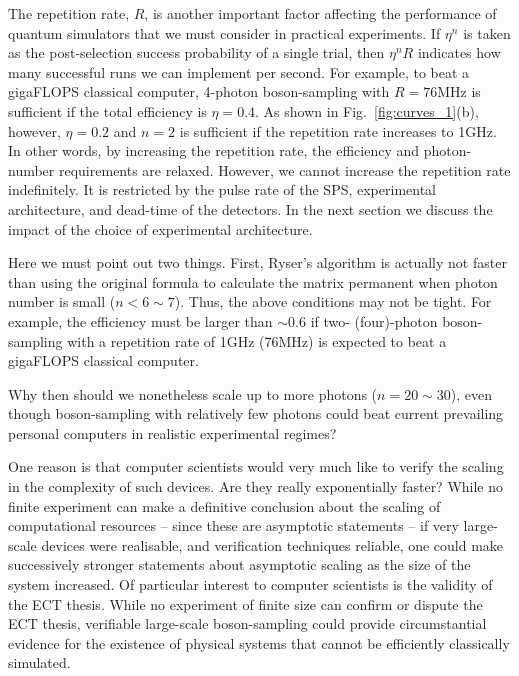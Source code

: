 \documentclass[aps,rmp,twocolumn,amsmath,amssymb,nofootinbib,superscriptaddress]{revtex4}
\begin{document}
The repetition rate, $R$, is another important factor affecting the performance of quantum simulators that we must consider in practical experiments. If $\eta^n$ is taken as the post-selection success probability of a single trial, then \mbox{$\eta^n R$} indicates how many successful runs we can implement per second. For example, to beat a gigaFLOPS classical computer, 4-photon boson-sampling with \mbox{$R=76\mathrm{MHz}$} is sufficient if the total efficiency is \mbox{$\eta=0.4$}. As shown in Fig.~\ref{fig:curves_1}(b), however, \mbox{$\eta=0.2$} and \mbox{$n=2$} is sufficient if the repetition rate increases to 1GHz. In other words, by increasing the repetition rate, the efficiency and photon-number requirements are relaxed. However, we cannot increase the repetition rate indefinitely. It is restricted by the pulse rate of the SPS, experimental architecture, and dead-time of the detectors. In the next section we discuss the impact of the choice of experimental architecture.

Here we must point out two things. First, Ryser's algorithm is actually not faster than using the original formula to calculate the matrix permanent when photon number is small (\mbox{$n<6\sim 7$}). Thus, the above conditions may not be tight. For example, the efficiency must be larger than $\sim 0.6$ if two- (four)-photon boson-sampling with a repetition rate of 1GHz (76MHz) is expected to beat a gigaFLOPS classical computer. 

Why then should we nonetheless scale up to more photons (\mbox{$n=20\sim 30$}), even though boson-sampling with relatively few photons could beat current prevailing personal computers in realistic experimental regimes?

One reason is that computer scientists would very much like to verify the scaling in the complexity of such devices. Are they really exponentially faster? While no finite experiment can make a definitive conclusion about the scaling of computational resources -- since these are asymptotic statements -- if very large-scale devices were realisable, and verification techniques reliable, one could make successively stronger statements about asymptotic scaling as the size of the system increased. Of particular interest to computer scientists is the validity of the ECT thesis. While no experiment of finite size can confirm or dispute the ECT thesis, verifiable large-scale boson-sampling could provide circumstantial evidence for the existence of physical systems that cannot be efficiently classically simulated.
\end{document}
